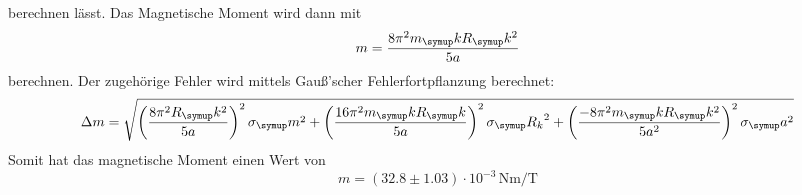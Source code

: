 berechnen lässt. Das Magnetische Moment wird dann mit
\begin{equation*}
  m = \frac{8\pi^2m_\su{k}R_\su{k}^2}{5a}
\end{equation*}
berechnen. Der zugehörige Fehler wird mittels Gauß'scher Fehlerfortpflanzung
berechnet:
\begin{equation*}
  \Delta m = \sqrt{\left(\frac{8\pi^2R_\su{k}^2}{5a}\right)^2\sigma_\su{m}^2 +
  \left(\frac{16\pi^2m_\su{k}R_\su{k}}{5a}\right)^2\sigma_\su{R_k}^2 +
  \left(\frac{-8\pi^2m_\su{k}R_\su{k}^2}{5a^2}\right)^2\sigma_\su{a}^2}
\end{equation*}
Somit hat das magnetische Moment einen Wert von
\begin{equation*}
  m = (32.8 \pm 1.03)\cdot10^{-3}\,\si{\newton\meter\per\tesla} 
\end{equation*}
